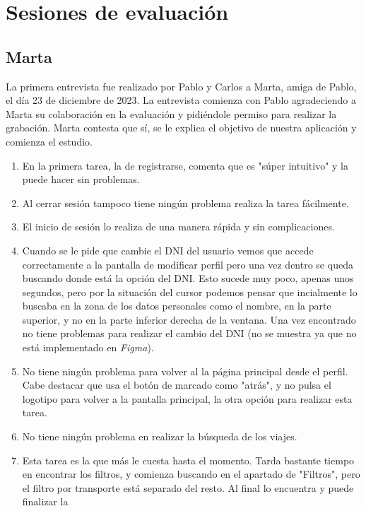 \section{Sesiones de evaluación}

\subsection{Marta}

La primera entrevista fue realizado por Pablo y Carlos a Marta, amiga de Pablo, el día 23 de diciembre de 2023. La entrevista
comienza con Pablo agradeciendo a Marta su colaboración en la evaluación y pidiéndole permiso para realizar la grabación. Marta
contesta que sí, se le explica el objetivo de nuestra aplicación y comienza el estudio.

\begin{enumerate}
    \item En la primera tarea, la de registrarse, comenta que es "súper intuitivo" y la puede hacer sin problemas.
    \item Al cerrar sesión tampoco tiene ningún problema realiza la tarea fácilmente.
    \item El inicio de sesión lo realiza de una manera rápida y sin complicaciones.
    \item Cuando se le pide que cambie el DNI del usuario vemos que accede correctamente a la pantalla de modificar perfil
        pero una vez dentro se queda buscando donde está la opción del DNI. Esto sucede muy poco, apenas unos segundos, pero
        por la situación del cursor podemos pensar que incialmente lo buscaba en la zona de los datos personales como el nombre, en la
        parte superior, y no en la parte inferior derecha de la ventana. Una vez encontrado no tiene problemas para realizar el cambio
        del DNI (no se muestra ya que no está implementado en \textit{Figma}).
    \item No tiene ningún problema para volver al la página principal desde el perfil. Cabe destacar que usa el botón de marcado
        como "atrás", y no pulsa el logotipo para volver a la pantalla principal, la otra opción para realizar esta tarea.
    \item No tiene ningún problema en realizar la búsqueda de los viajes.
    \item Esta tarea es la que más le cuesta hasta el momento. Tarda bastante tiempo en encontrar los filtros, y comienza buscando
        en el apartado de "Filtros", pero el filtro por transporte está separado del resto. Al final lo encuentra y puede finalizar la

\end{enumerate}
